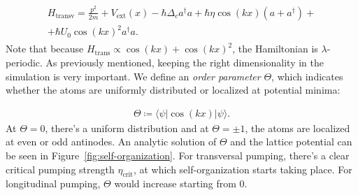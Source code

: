 \begin{align}
\begin{split}
H_\text{transv} = \frac{p^2}{2m} + V_\text{ext}(x) - \hbar \Delta_c a^\dagger a + \hbar \eta \cos(kx) (a + a^\dagger) + \\
 + \hbar U_0 \cos(kx)^2 a^\dagger a.
\end{split}
\end{align}Note that because $H_\text{trans} \propto \cos(kx) + \cos(kx)^2$, the Hamiltonian is $\lambda$-periodic. As previously mentioned, keeping the right dimensionality in the simulation is very important. We define an \textit{order parameter} $\Theta$, which indicates whether the atoms are uniformly distributed or localized at potential minima:

\begin{align}
\Theta \coloneqq \langle \psi | \cos(kx) | \psi \rangle.
\end{align}At $\Theta = 0$, there's a uniform distribution and at $\Theta = \pm 1$, the atoms are localized at even or odd antinodes. An analytic solution of $\Theta$ and the lattice potential can be seen in Figure~\ref{fig:self-organization}. For transversal pumping, there's a clear critical pumping strength $\eta_\text{crit}$, at which self-organization starts taking place. For longitudinal pumping, $\Theta$ would increase starting from 0.

